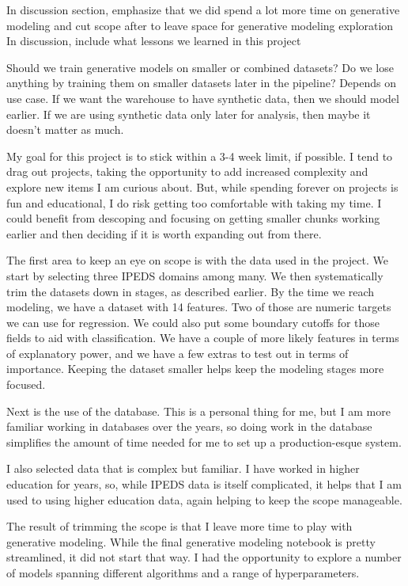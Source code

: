 \documentclass[sigconf, authorversion, nonacm]{acmart}
\begin{document}
    In discussion section, emphasize that we did spend a lot more time on generative modeling and cut scope after to leave space for generative modeling exploration
    In discussion, include what lessons we learned in this project

    Should we train generative models on smaller or combined datasets? Do we lose anything by training them on smaller datasets later in the pipeline? Depends on use case. If we want the warehouse to have synthetic data, then we should model earlier. If we are using synthetic data only later for analysis, then maybe it doesn't matter as much.





    My goal for this project is to stick within a 3-4 week limit, if possible. I tend to drag out projects, taking the opportunity to add increased complexity and explore new items I am curious about. But, while spending forever on projects is fun and educational, I do risk getting too comfortable with taking my time. I could benefit from descoping and focusing on getting smaller chunks working earlier and then deciding if it is worth expanding out from there.

    The first area to keep an eye on scope is with the data used in the project. We start by selecting three IPEDS domains among many. We then systematically trim the datasets down in stages, as described earlier. By the time we reach modeling, we have a dataset with 14 features. Two of those are numeric targets we can use for regression. We could also put some boundary cutoffs for those fields to aid with classification. We have a couple of more likely features in terms of explanatory power, and we have a few extras to test out in terms of importance. Keeping the dataset smaller helps keep the modeling stages more focused.

    Next is the use of the database. This is a personal thing for me, but I am more familiar working in databases over the years, so doing work in the database simplifies the amount of time needed for me to set up a production-esque system.

    I also selected data that is complex but familiar. I have worked in higher education for years, so, while IPEDS data is itself complicated, it helps that I am used to using higher education data, again helping to keep the scope manageable.

    The result of trimming the scope is that I leave more time to play with generative modeling. While the final generative modeling notebook is pretty streamlined, it did not start that way. I had the opportunity to explore a number of models spanning different algorithms and a range of hyperparameters.
\end{document}
